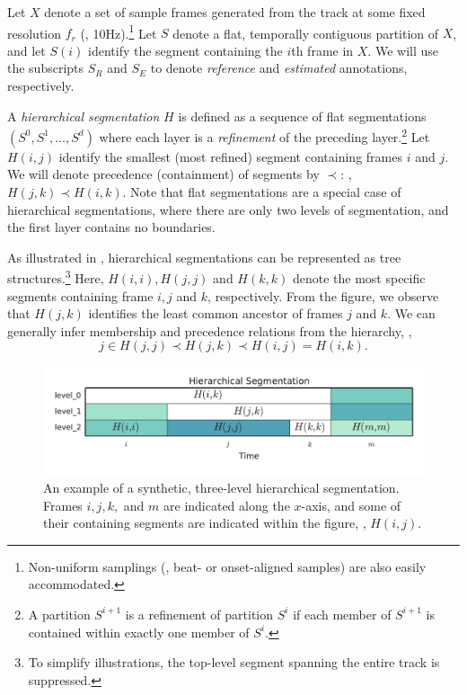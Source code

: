 \documentclass{article}
\begin{document}
Let $X$ denote a set of sample frames generated from the track at some fixed resolution $f_r$ (\eg,
10Hz).\footnote{Non-uniform samplings (\eg, beat- or onset-aligned samples) are also easily accommodated.}
Let $S $ denote a flat, temporally contiguous partition of $X$,
and let $S(i)$ identify the segment containing the $i$th frame in $X$.
We will use the subscripts $S_R$ and $S_E$ to denote \emph{reference} and \emph{estimated} annotations, respectively.

A \emph{hierarchical segmentation} $H$ is defined as a sequence of flat segmentations $(S^0, S^1, \dots, S^d)$ where each layer is a \emph{refinement}
of the preceding layer.\footnote{A partition $S^{i+1}$ is a refinement of partition $S^{i}$ if each member of $S^{i+1}$ is contained within exactly one member of $S^i$.}
Let $H(i,j)$ identify the smallest (most refined) segment containing frames $i$ and $j$.
We will denote precedence (containment) of segments by $\prec$: \eg, $H(j, k) \prec H(i, k)$.
Note that flat segmentations are a special case of hierarchical segmentations, where there are only two
levels of segmentation, and the first layer contains no boundaries.

As illustrated in , hierarchical segmentations can be represented as tree structures.\footnote{To simplify illustrations, 
the top-level segment spanning the entire track is suppressed.}
Here, $H(i, i), H(j, j)$ and $H(k,k)$ denote the most specific segments containing frame $i, j$ and $k$,
respectively.
From the figure, we observe that $H(j,k)$ identifies the least common ancestor of frames $j$ and $k$.
We can generally infer membership and precedence relations from the hierarchy, \eg,
\begin{equation}
j \in H(j, j) \prec H(j, k) \prec H(i, j) = H(i, k).
\end{equation}


\begin{figure}
  \centering
  \includegraphics[width=\columnwidth]{figs/hier-example.pdf}
  \caption{An example of a synthetic, three-level hierarchical segmentation.
  Frames $i, j, k,$ and $m$ are indicated along the $x$-axis, and some of their containing segments are indicated within the figure, \eg, $H(i, j)$.}
  \label{fig:hier-example}
\end{figure}
\end{document}
